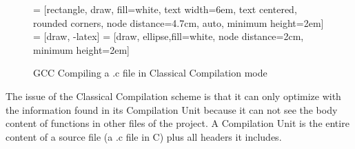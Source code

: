 \documentclass[runningheads]{llncs}
\begin{document}
\begin{figure}
 = [rectangle, draw, fill=white,
    text width=6em, text centered, rounded corners, node distance=4.7cm, auto, minimum height=2em]
 = [draw, -latex]
 = [draw, ellipse,fill=white, node distance=2cm,
    minimum height=2em]
%
\caption{GCC Compiling a .c file in Classical Compilation mode}
\label{fig:gnu_toolchain}
\end{figure}

The issue of the Classical Compilation scheme is that it can only optimize with
the information found in its Compilation Unit because it can not see the body
content of functions in other files of the project. A Compilation Unit is the
entire content of a source file (a .c file in C) plus all headers it includes.
\end{document}
